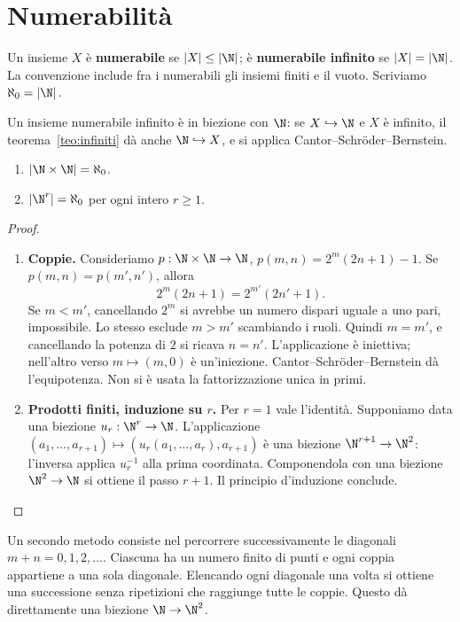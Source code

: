 \section{Numerabilità}
\begin{definizione}
Un insieme $X$ è \textbf{numerabile} se $|X|\le|\N|$; è \textbf{numerabile infinito} se $|X|=|\N|$. La convenzione include fra i numerabili gli insiemi finiti e il vuoto. Scriviamo $\aleph_0=|\N|$.
\end{definizione}

Un insieme numerabile infinito è in biezione con $\N$: se $X\hookrightarrow\N$ e $X$ è infinito, il teorema~\ref{teo:infiniti} dà anche $\N\hookrightarrow X$, e si applica Cantor--Schröder--Bernstein.

\begin{proposizione}
\begin{enumerate}[label=\arabic*.]
\item $|\N\times\N|=\aleph_0$.
\item $|\N^r|=\aleph_0$ per ogni intero $r\ge1$.
\end{enumerate}
\end{proposizione}
\begin{proof}
\begin{enumerate}[label=\arabic*.]
\item \textbf{Coppie.} Consideriamo $p:\N\times\N\to\N$, $p(m,n)=2^m(2n+1)-1$. Se $p(m,n)=p(m',n')$, allora
\[
2^m(2n+1)=2^{m'}(2n'+1).
\]
Se $m<m'$, cancellando $2^m$ si avrebbe un numero dispari uguale a uno pari, impossibile. Lo stesso esclude $m>m'$ scambiando i ruoli. Quindi $m=m'$, e cancellando la potenza di $2$ si ricava $n=n'$. L'applicazione è iniettiva; nell'altro verso $m\mapsto(m,0)$ è un'iniezione. Cantor--Schröder--Bernstein dà l'equipotenza. Non si è usata la fattorizzazione unica in primi.
\item \textbf{Prodotti finiti, induzione su $r$.} Per $r=1$ vale l'identità. Supponiamo data una biezione $u_r:\N^r\to\N$. L'applicazione $(a_1,\ldots,a_{r+1})\mapsto(u_r(a_1,\ldots,a_r),a_{r+1})$ è una biezione $\N^{r+1}\to\N^2$: l'inversa applica $u_r^{-1}$ alla prima coordinata. Componendola con una biezione $\N^2\to\N$ si ottiene il passo $r+1$. Il principio d'induzione conclude.
\end{enumerate}
\end{proof}

\begin{osservazione}
Un secondo metodo consiste nel percorrere successivamente le diagonali $m+n=0,1,2,\ldots$. Ciascuna ha un numero finito di punti e ogni coppia appartiene a una sola diagonale. Elencando ogni diagonale una volta si ottiene una successione senza ripetizioni che raggiunge tutte le coppie. Questo dà direttamente una biezione $\N\to\N^2$.
\end{osservazione}

